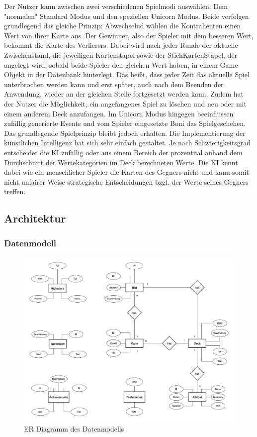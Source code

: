 \documentclass{scrartcl}
\begin{document}
\noindent
Der Nutzer kann zwischen zwei verschiedenen Spielmodi auswählen: Dem "normalen" Standard Modus und den speziellen Unicorn Modus.
Beide verfolgen grundlegend das gleiche Prinzip: Abwechselnd wählen die Kontrahenten einen Wert von ihrer Karte aus. Der Gewinner, also der Spieler mit dem besseren Wert, bekommt die Karte des Verlierers.
Dabei wird nach jeder Runde der aktuelle Zwischenstand, die jeweiligen Kartenstapel sowie der StichKartenStapel, der angelegt wird, sobald beide Spieler den gleichen Wert haben, in einem Game Objekt in der Datenbank hinterlegt.
Das heißt, dass jeder Zeit das aktuelle Spiel unterbrochen werden kann und erst später, auch nach dem Beenden der Anwendung, wieder an der gleichen Stelle fortgesetzt werden kann. Zudem hat der Nutzer die Möglichkeit, ein angefangenes Spiel zu löschen und
neu oder mit einem anderem Deck anzufangen.
\newline
Im Unicorn Modus hingegen beeinflussen zufällig generierte Events und vom Spieler eingesetzte Boni das Spielgeschehen. Das grundlegende Spielprinzip bleibt jedoch erhalten.
\newline
Die Implementierung der künstlichen Intelligenz hat sich sehr einfach gestaltet. Je nach Schwierigkeitsgrad entscheidet die KI zufällig oder aus einem Bereich der prozentual anhand dem Durchschnitt der Wertekategorien im Deck berechneten Werte.
Die KI kennt dabei wie ein menschlicher Spieler die Karten des Gegners nicht und kann somit nicht unfairer Weise strategische Entscheidungen bzgl. der Werte seines Gegners treffen.
 
\subsection{Architektur}
\subsubsection{Datenmodell}

\begin{figure}[h]
  \centering
  \includegraphics[width=\textwidth]{img/map_er.png}
  \caption{ER Diagramm des Datenmodells}
\end{figure}
\end{document}
